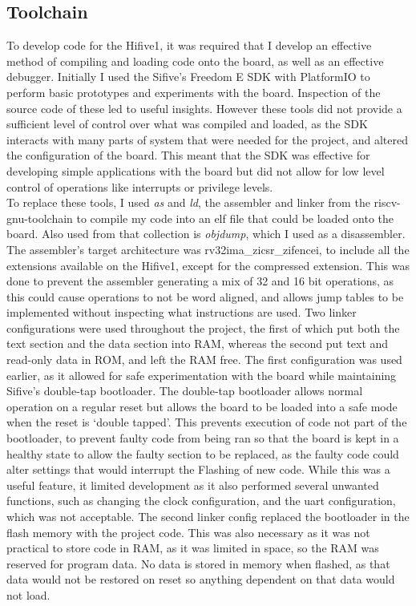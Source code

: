 \subsection{Toolchain}
To develop code for the Hifive1, it was required that I develop an effective method of compiling and loading code onto the board, as well as an effective debugger. Initially I used the Sifive's Freedom E SDK with PlatformIO to perform basic prototypes and experiments with the board. Inspection of the source code of these led to useful insights. However these tools did not provide a sufficient level of control over what was compiled and loaded, as the SDK interacts with many parts of system that were needed for the project, and altered the configuration of the board. This meant that the SDK was effective for developing simple applications with the board but did not allow for low level control of operations like interrupts or privilege levels. \\
To replace these tools, I used \textit{as} and \textit{ld}, the assembler and linker from the riscv-gnu-toolchain to compile my code into an elf file that could be loaded onto the board. Also used from that collection is \textit{objdump}, which I used as a disassembler. The assembler's target architecture was rv32ima\_zicsr\_zifencei, to include all the extensions available on the Hifive1, except for the compressed extension. This was done to prevent the assembler generating a mix of 32 and 16 bit operations, as this could cause operations to not be word aligned, and allows jump tables to be implemented without inspecting what instructions are used. Two linker configurations were used throughout the project, the first of which put both the text section and the data section into RAM, whereas the second put text and read-only data in ROM, and left the RAM free. The first configuration was used earlier, as it allowed for safe experimentation with the board while maintaining Sifive's double-tap bootloader. The double-tap bootloader allows normal operation on a regular reset but allows the board to be loaded into a safe mode when the reset is `double tapped'. This prevents execution of code not part of the bootloader, to prevent faulty code from being ran so that the board is kept in a healthy state to allow the faulty section to be replaced, as the faulty code could alter settings that would interrupt the Flashing of new code. While this was a useful feature, it limited development as it also performed several unwanted functions, such as changing the clock configuration, and the uart configuration, which was not acceptable. The second linker config replaced the bootloader in the flash memory with the project code. This was also necessary as it was not practical to store code in RAM, as it was limited in space, so the RAM was reserved for program data. No data is stored in memory when flashed, as that data would not be restored on reset so anything dependent on that data would not load.\\
